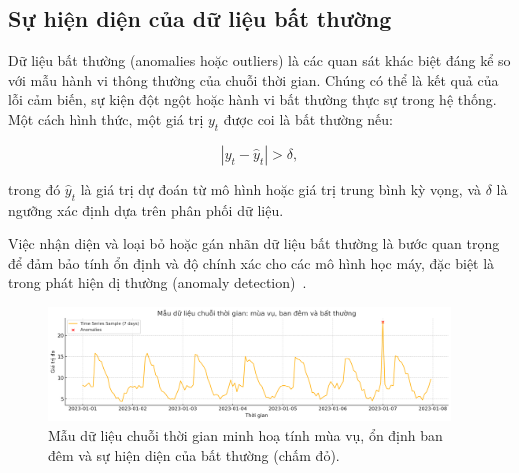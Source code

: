 \subsection{Sự hiện diện của dữ liệu bất thường}

Dữ liệu bất thường (anomalies hoặc outliers) là các quan sát khác biệt đáng kể so với mẫu hành vi thông thường của chuỗi thời gian. Chúng có thể là kết quả của lỗi cảm biến, sự kiện đột ngột hoặc hành vi bất thường thực sự trong hệ thống. Một cách hình thức, một giá trị \( y_t \) được coi là bất thường nếu:

\begin{equation}
    |y_t - \hat{y}_t| > \delta,
\end{equation}

trong đó \( \hat{y}_t \) là giá trị dự đoán từ mô hình hoặc giá trị trung bình kỳ vọng, và \( \delta \) là ngưỡng xác định dựa trên phân phối dữ liệu.

Việc nhận diện và loại bỏ hoặc gán nhãn dữ liệu bất thường là bước quan trọng để đảm bảo tính ổn định và độ chính xác cho các mô hình học máy, đặc biệt là trong phát hiện dị thường (anomaly detection)~\cite{hundman2018detecting, malhotra2016lstm}.

\begin{figure}[H]
    \centering
    \includegraphics[width=0.95\textwidth]{image/section3_2/time_series_example.png}
    \caption{Mẫu dữ liệu chuỗi thời gian minh hoạ tính mùa vụ, ổn định ban đêm và sự hiện diện của bất thường (chấm đỏ).}
    \label{fig:section3_2__1}
\end{figure}
